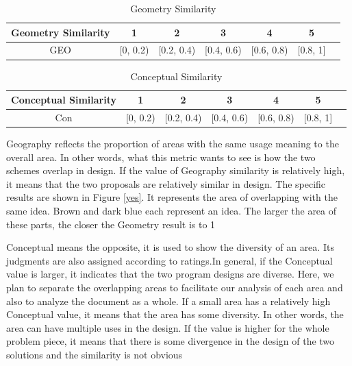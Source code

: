 \begin{table}[H]
\centering
\caption{Geometry Similarity}
\label{tab:my-tablettt}
\begin{tabular}{|c|c|c|c|c|c|c|}
\hline
Geometry Similarity & 1 & 2 & 3 & 4 & 5          \\ \hline
GEO & [0, 0.2) &  [0.2, 0.4) & [0.4, 0.6)  & [0.6, 0.8)  &[0.8, 1]   \\ \hline
\end{tabular}
\end{table}
\begin{table}[H]
\centering
\caption{Conceptual Similarity}
\label{tab:my-tableeee}
\begin{tabular}{|c|c|c|c|c|c|c|}
\hline
Conceptual Similarity & 1 & 2 & 3 & 4 & 5          \\ \hline
Con & [0, 0.2) &  [0.2, 0.4) & [0.4, 0.6)  & [0.6, 0.8)  &[0.8, 1]   \\ \hline
\end{tabular}
\end{table}
Geography reflects the proportion of areas with the same usage meaning to the overall area. In other words, what this metric wants to see is how the two schemes overlap in design. If the value of Geography similarity is relatively high, it means that the two proposals are relatively similar in design. The specific results are shown in Figure \ref{yes}. It represents the area of overlapping with the same idea. Brown and dark blue each represent an idea. The larger the area of these parts, the closer the Geometry result is to 1


Conceptual means the opposite, it is used to show the diversity of an area. Its judgments are also assigned according to ratings.In general, if the Conceptual value is larger, it indicates that the two program designs are diverse. Here, we plan to separate the overlapping areas to facilitate our analysis of each area and also to analyze the document as a whole. If a small area has a relatively high Conceptual value, it means that the area has some diversity. In other words, the area can have multiple uses in the design. If the value is higher for the whole problem piece, it means that there is some divergence in the design of the two solutions and the similarity is not obvious



